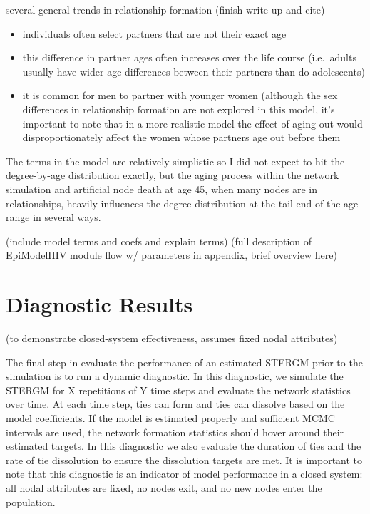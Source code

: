 \documentclass [11pt, proquest] {uwthesis}[2015/03/03]
\providecommand{\tightlist}{%
  \setlength{\itemsep}{0pt}\setlength{\parskip}{0pt}}
\begin{document}
several general trends in relationship formation (finish write-up and
cite) --
\begin{itemize}
\tightlist
\item
  individuals often select partners that are not their exact age
\item
  this difference in partner ages often increases over the life course
  (i.e.~adults usually have wider age differences between their partners
  than do adolescents)
\item
  it is common for men to partner with younger women (although the sex
  differences in relationship formation are not explored in this model,
  it's important to note that in a more realistic model the effect of
  aging out would disproportionately affect the women whose partners age
  out before them
\end{itemize}
The terms in the model are relatively simplistic so I did not expect to
hit the degree-by-age distribution exactly, but the aging process within
the network simulation and artificial node death at age 45, when many
nodes are in relationships, heavily influences the degree distribution
at the tail end of the age range in several ways.

(include model terms and coefs and explain terms) (full description of
EpiModelHIV module flow w/ parameters in appendix, brief overview here)

\section{Diagnostic Results}\label{diagnostic-results}

(to demonstrate closed-system effectiveness, assumes fixed nodal
attributes)

The final step in evaluate the performance of an estimated STERGM prior
to the simulation is to run a dynamic diagnostic. In this diagnostic, we
simulate the STERGM for X repetitions of Y time steps and evaluate the
network statistics over time. At each time step, ties can form and ties
can dissolve based on the model coefficients. If the model is estimated
properly and sufficient MCMC intervals are used, the network formation
statistics should hover around their estimated targets. In this
diagnostic we also evaluate the duration of ties and the rate of tie
dissolution to ensure the dissolution targets are met. It is important
to note that this diagnostic is an indicator of model performance in a
closed system: all nodal attributes are fixed, no nodes exit, and no new
nodes enter the population.
\end{document}
